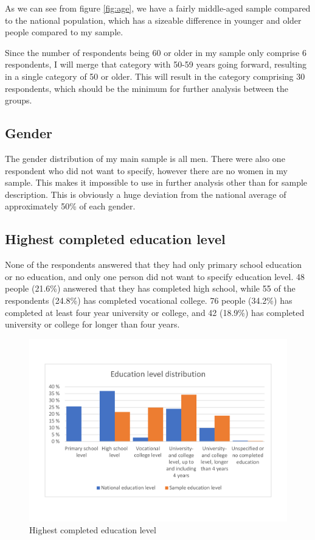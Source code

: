 As we can see from figure \ref{fig:age}, we have a fairly middle-aged sample compared to the national population, which has a sizeable difference in younger and older people compared to my sample. 

Since the number of respondents being 60 or older in my sample only comprise 6 respondents, I will merge that category with 50-59 years going forward, resulting in a single category of 50 or older. This will result in the category comprising 30 respondents, which should be the minimum for further analysis between the groups. 

\subsection{Gender}
\label{subsec:gender}
The gender distribution of my main sample is all men. There were also one respondent who did not want to specify, however there are no women in my sample. This makes it impossible to use in further analysis other than for sample description. This is obviously a huge deviation from the national average of approximately 50\% of each gender. 


\subsection{Highest completed education level}
None of the respondents answered that they had only primary school education or no education, and only one person did not want to specify education level. 48 people (21.6\%) answered that they has completed high school, while 55 of the respondents (24.8\%) has completed vocational college. 76 people (34.2\%) has completed at least four year university or college, and 42 (18.9\%) has completed university or college for longer than four years. 
\begin{figure}[!h]
    \centering
    \includegraphics[scale=0.45]{figures/diagrams/education_ssb.pdf}
    \caption{Highest completed education level}
    \label{fig:education}
\end{figure}

